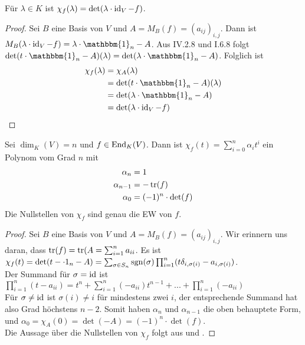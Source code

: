 \begin{lemma}
	Für $\lambda\in K$ ist $\chi_f(\lambda)=\det(\lambda\cdot\operatorname{id}_V-f)$.
\end{lemma}
\begin{proof}
	Sei $B$ eine Basis von $V$ und $A=M_B(f)=(a_{ij})_{i,j}$. Dann ist $M_B(\lambda\cdot\id_V-f)= \lambda\cdot \mathbbm{1}_n-A$. Aus IV.2.8 und I.6.8 folgt $\det(t\cdot \mathbbm{1}_n-A)(\lambda)=\det(\lambda\cdot \mathbbm{1}_n-A)$. Folglich ist 
	\begin{align}
		\chi_f(\lambda)&=\chi_A(\lambda)\notag \\
		&=\det(t\cdot \mathbbm{1}_n-A)(\lambda)\notag \\
		&=\det(\lambda\cdot \mathbbm{1}_n-A)\notag \\
		&= \det(\lambda\cdot\id_V-f) \notag
	\end{align}
\end{proof}

\begin{proposition}
	Sei $\dim_K(V)=n$ und $f\in\operatorname{End}_K(V)$. Dann ist $\chi_f(t)=\sum_{i=0}^n \alpha_i t^i$ ein Polynom vom Grad $n$ mit 
	\begin{align}
		\alpha_n&=1\notag \\
		\alpha_{n-1}&=-\operatorname{tr}(f) \notag \\
		\alpha_0 &= (-1)^n\cdot\det(f) \notag
	\end{align}
	Die Nullstellen von $\chi_f$ sind genau die EW von $f$.
\end{proposition}
\begin{proof}
	Sei $B$ eine Basis von $V$ und $A=M_B(f)=(a_{ij})_{i,j}$. Wir erinnern uns daran, dass $\operatorname{tr}(f)=\operatorname{tr}(A=\sum_{i=1}^n a_{ii}$. Es ist $\chi_f(t)=\det(t-\cdot 1_n-A)=\sum_{\sigma\in S_n}\operatorname{sgn}(\sigma)\prod_{i=1}^n (t\delta_{i,\sigma(i)}-a_{i,\sigma(i)})$. \\
	Der Summand für \emph{$\sigma=\operatorname{id}$} ist $\prod_{i=1}^n (t-a_{ii})=t^n+\sum_{i=1}^n (-a_{ii})t^{n-1}+...+\prod_{i=1}^n(-a_{ii})$ \\
	Für \emph{$\sigma\neq\operatorname{id}$} ist $\sigma(i)\neq i$ für mindestens zwei $i$, der entsprechende Summand hat also Grad höchstens $n-2$. Somit haben $\alpha_n$ und $\alpha_{n-1}$ die oben behauptete Form, und $\alpha_0=\chi_A(0)=\det(-A)=(-1)^n\cdot\det(f)$. \\
	Die Aussage über die Nullstellen von $\chi_f$ folgt aus  und .
\end{proof}

